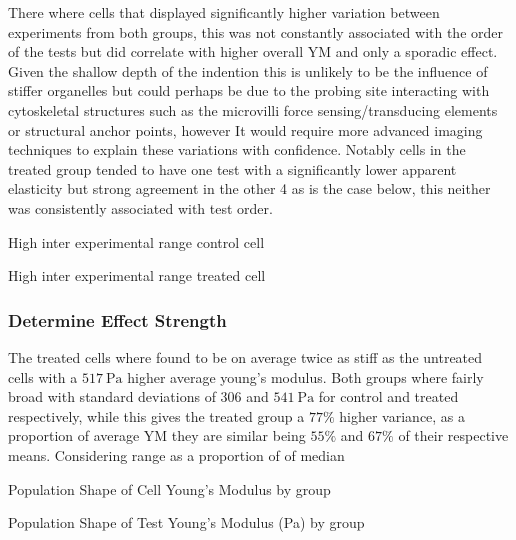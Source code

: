 \documentclass[
  paper=a4,
  ,captions=tableheading
]{scrartcl}
\makeatletter
\newcommand*\pandocbounded[1]{%
  \sbox\pandoc@box{#1}%
  \Gscale@div\@tempa{\textheight}{\dimexpr\ht\pandoc@box+\dp\pandoc@box\relax}%
  \Gscale@div\@tempb{\linewidth}{\wd\pandoc@box}%
  \ifdim\@tempb\p@<\@tempa\p@\let\@tempa\@tempb\fi%
  \ifdim\@tempa\p@<\p@\scalebox{\@tempa}{\usebox\pandoc@box}%
  \else\usebox{\pandoc@box}%
  \fi%
}
\renewenvironment{quote}{\begin{customblockquote}\list{}{\rightmargin=0em\leftmargin=0em}%
\item\relax\color{blockquote-text}\ignorespaces}{\unskip\unskip\endlist\end{customblockquote}}
\makeatother
\begin{document}
There where cells that displayed significantly higher variation between
experiments from both groups, this was not constantly associated with
the order of the tests but did correlate with higher overall YM and only
a sporadic effect. Given the shallow depth of the indention this is
unlikely to be the influence of stiffer organelles but could perhaps be
due to the probing site interacting with cytoskeletal structures such as
the microvilli force sensing/transducing elements or structural anchor
points, however It would require more advanced imaging techniques to
explain these variations with confidence. Notably cells in the treated
group tended to have one test with a significantly lower apparent
elasticity but strong agreement in the other 4 as is the case below,
this neither was consistently associated with test order.

\noindent
\begin{minipage}[t]{0.48\textwidth}
\begin{quote}
\pandocbounded{}
High inter experimental range control cell
\end{quote}
\end{minipage}
\hfill
\begin{minipage}[t]{0.48\textwidth}
\begin{quote}
\pandocbounded{}
High inter experimental range treated cell
\end{quote}
\end{minipage}

\subsubsection{Determine Effect
Strength}\label{determine-effect-strength}

The treated cells where found to be on average twice as stiff as the
untreated cells with a \(517 \ \text{Pa}\) higher average young's
modulus. Both groups where fairly broad with standard deviations of
\(306\) and \(541 \ \text{Pa}\) for control and treated respectively,
while this gives the treated group a \(77\%\) higher variance, as a
proportion of average YM they are similar being \(55\%\) and \(67\%\) of
their respective means. Considering range as a proportion of of median

\noindent
\begin{minipage}[t]{0.48\textwidth}
\begin{quote}
\pandocbounded{}
Population Shape of Cell Young's Modulus by group
\end{quote}
\end{minipage}
\hfill
\begin{minipage}[t]{0.48\textwidth}
\begin{quote}
\pandocbounded{}
Population Shape of Test Young's Modulus (Pa) by group
\end{quote}
\end{minipage}
\end{document}
